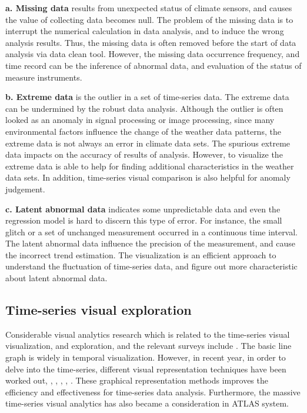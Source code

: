 \documentclass{vgtc}                          %
\begin{document}
{\bf a. Missing data} results from unexpected status of climate sensors, and causes the value of collecting data becomes null. The problem of the missing data is to interrupt the numerical calculation in data analysis, and to induce the wrong analysis results. Thus, the missing data is often removed before the start of data analysis via data clean tool. However, the missing data occurrence frequency, and time record can be the inference of abnormal data, and evaluation of the status of measure instruments. 

{\bf b. Extreme data} is the outlier \cite{rousseeuw2005robust}in a set of time-series data. The extreme data can be undermined by the robust data analysis. Although the outlier is often looked as an anomaly in signal processing or image processing, since many environmental factors influence the change of the weather data patterns, the extreme data is not always an error in climate data sets. The spurious extreme data impacts on the accuracy of results of analysis. However, to visualize the extreme data is able to help for finding additional characteristics in the weather data sets. In addition, time-series visual comparison is also helpful for anomaly judgement.
 
{\bf c. Latent abnormal data} indicates some unpredictable data and even the regression model is hard to discern this type of error. For instance, the small glitch or a set of unchanged measurement occurred in a continuous time interval. The latent abnormal data influence the precision of the measurement, and cause the incorrect trend estimation. The visualization is an efficient approach to understand the fluctuation of time-series data, and figure out more characteristic about latent abnormal data.

\subsection{Time-series visual exploration}

Considerable visual analytics research which is related to the time-series visual visualization, and exploration, and the relevant surveys include \cite{silva2000visualization}. The basic line graph \cite{tufte1983visual}is widely in temporal visualization. However, in recent year, in order to delve into the time-series, different visual representation techniques have been worked out\cite{bremm2011interactive}, \cite{mclachlan2008liverac}, \cite{javed2010stack}, \cite{sip2012}, \cite{Liao2010}, \cite{Liao2011}. These graphical representation methods improves the efficiency and effectiveness for time-series data analysis. Furthermore, the massive time-series visual analytics has also became a consideration in ATLAS \cite{chan2008maintaining} system.
 
\end{document}
